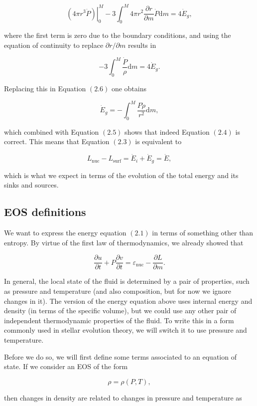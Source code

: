 \documentclass[twocolumn]{article}
\begin{document}
\[\left.\left(4\pi r^3 \dot{P}\right)\right|_0^M-3\int_0^M 4\pi r^2 \frac{\partial r}{\partial m}\dot{P}\mathrm{d}m=4\dot{E}_g,\]

where the first term is zero due to the boundary conditions, and using
the equation of continuity to replace \(\partial r/\partial m\) results
in

\[-3\int_0^M\frac{\dot{P}}{\rho}\mathrm{d}m=4\dot{E}_g.\]

Replacing this in Equation \((2.6)\) one obtains

\[\dot{E}_g=-\int_0^M \frac{P\dot{\rho}}{r^2}\mathrm{d}m,\]

which combined with Equation \((2.5)\) shows that indeed Equation
\((2.4)\) is correct. This means that Equation \((2.3)\) is equivalent
to

\[L_\mathrm{nuc}-L_\mathrm{surf}=\dot{E}_i+\dot{E}_g = \dot{E},\]

which is what we expect in terms of the evolution of the total energy
and its sinks and sources.

\hypertarget{eos-definitions}{%
\subsection{EOS definitions}\label{eos-definitions}}

We want to express the energy equation \((2.1)\) in terms of something
other than entropy. By virtue of the first law of thermodynamics, we
already showed that

\[\frac{\partial u}{\partial t}+P\frac{\partial v}{\partial t}=\varepsilon_\mathrm{nuc}-\frac{\partial L}{\partial m}.\tag{2.8}\]

In general, the local state of the fluid is determined by a pair of
properties, such as pressure and temperature (and also composition, but
for now we ignore changes in it). The version of the energy equation
above uses internal energy and density (in terms of the specific
volume), but we could use any other pair of independent thermodynamic
properties of the fluid. To write this in a form commonly used in
stellar evolution theory, we will switch it to use pressure and
temperature.

Before we do so, we will first define some terms associated to an
equation of state. If we consider an EOS of the form

\[\rho=\rho(P,T),\]

then changes in density are related to changes in pressure and
temperature as
\end{document}
